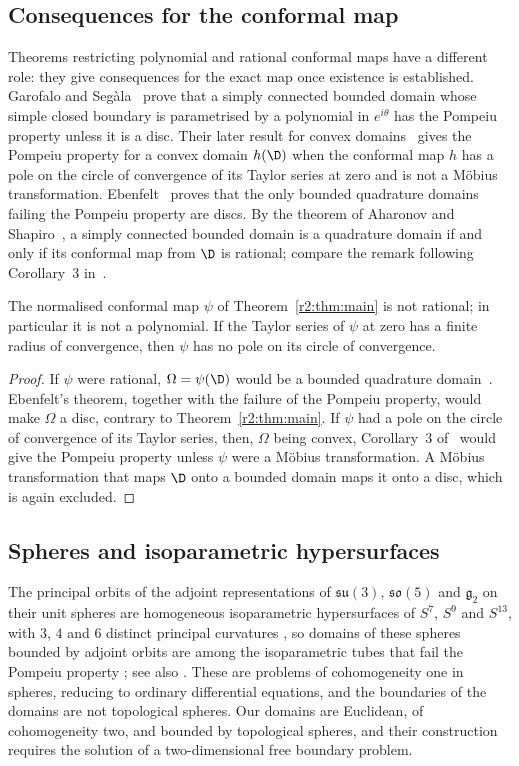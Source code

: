 \subsection{Consequences for the conformal map}
Theorems restricting polynomial and rational conformal maps have a different role: they give consequences for the exact map once existence is established. Garofalo and Seg\`ala~\cite{GS91} prove that a simply connected bounded domain whose simple closed boundary is parametrised by a polynomial in $e^{i\theta}$ has the Pompeiu property unless it is a disc. Their later result for convex domains~\cite[Corollary 3]{GS94} gives the Pompeiu property for a convex domain $h(\D)$ when the conformal map $h$ has a pole on the circle of convergence of its Taylor series at zero and is not a M\"obius transformation. Ebenfelt~\cite[Theorem 2.1]{Ebe93} proves that the only bounded quadrature domains failing the Pompeiu property are discs. By the theorem of Aharonov and Shapiro~\cite{AS76}, a simply connected bounded domain is a quadrature domain if and only if its conformal map from $\D$ is rational; compare the remark following Corollary~3 in~\cite{GS94}.

\begin{corollary}\label{r2:cor:nonrational}
The normalised conformal map $\psi$ of Theorem~\ref{r2:thm:main} is not rational; in particular it is not a polynomial. If the Taylor series of $\psi$ at zero has a finite radius of convergence, then $\psi$ has no pole on its circle of convergence.
\end{corollary}
\begin{proof}
If $\psi$ were rational, $\Omega=\psi(\D)$ would be a bounded quadrature domain~\cite{AS76}. Ebenfelt's theorem, together with the failure of the Pompeiu property, would make $\Omega$ a disc, contrary to Theorem~\ref{r2:thm:main}. If $\psi$ had a pole on the circle of convergence of its Taylor series, then, $\Omega$ being convex, Corollary~3 of~\cite{GS94} would give the Pompeiu property unless $\psi$ were a M\"obius transformation. A M\"obius transformation that maps $\D$ onto a bounded domain maps it onto a disc, which is again excluded.
\end{proof}

\subsection{Spheres and isoparametric hypersurfaces} The principal orbits of the adjoint representations of $\mathfrak{su}(3)$, $\mathfrak{so}(5)$ and $\mathfrak g_2$ on their unit spheres are homogeneous isoparametric hypersurfaces of $S^7$, $S^9$ and $S^{13}$, with $3$, $4$ and $6$ distinct principal curvatures \cite{HL71}, so domains of these spheres bounded by adjoint orbits are among the isoparametric tubes that fail the Pompeiu property \cite[Corollary~7]{PS21}; see also \cite{Shk00}. These are problems of cohomogeneity one in spheres, reducing to ordinary differential equations, and the boundaries of the domains are not topological spheres. Our domains are Euclidean, of cohomogeneity two, and bounded by topological spheres, and their construction requires the solution of a two-dimensional free boundary problem.

